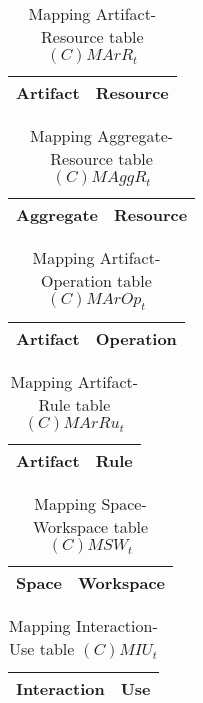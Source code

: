 \begin{table}[H]
	\centering
	\begin{tabular}{|p{4cm}|p{8cm}|}
			\hline
			\textbf{Artifact} & \textbf{Resource} \\
			\hline
			\hline
		\end{tabular}
	\caption{Mapping Artifact-Resource table $(C)MArR_t$}
	\label{tab:cmarrt}
\end{table}

\begin{table}[H]
	\centering
	\begin{tabular}{|p{4cm}|p{8cm}|}
			\hline
			\textbf{Aggregate} & \textbf{Resource} \\
			\hline
			\hline
		\end{tabular}
	\caption{Mapping Aggregate-Resource table $(C)MAggR_t$}
	\label{tab:cmaggrt}
\end{table}

\begin{table}[H]
	\centering
	\begin{tabular}{|p{4cm}|p{8cm}|}
			\hline
			\textbf{Artifact} & \textbf{Operation} \\
			\hline
			\hline
		\end{tabular}
	\caption{Mapping Artifact-Operation table $(C)MArOp_t$}
	\label{tab:cmaropt}
\end{table}

\begin{table}[H]
	\centering
	\begin{tabular}{|p{4cm}|p{8cm}|}
			\hline
			\textbf{Artifact} & \textbf{Rule} \\
			\hline
			\hline
		\end{tabular}
	\caption{Mapping Artifact-Rule table $(C)MArRu_t$}
	\label{tab:cmarrut}
\end{table}

\begin{table}[H]
	\centering
	\begin{tabular}{|p{4cm}|p{8cm}|}
			\hline
			\textbf{Space} & \textbf{Workspace} \\
			\hline
			\hline
		\end{tabular}
	\caption{Mapping Space-Workspace table $(C)MSW_t$}
	\label{tab:cmsrt}
\end{table}

\begin{table}[H]
	\centering
	\begin{tabular}{|p{4cm}|p{8cm}|}
			\hline
			\textbf{Interaction} & \textbf{Use} \\
			\hline
			\hline
		\end{tabular}
	\caption{Mapping Interaction-Use table $(C)MIU_t$}
	\label{tab:cmiut}
\end{table}

